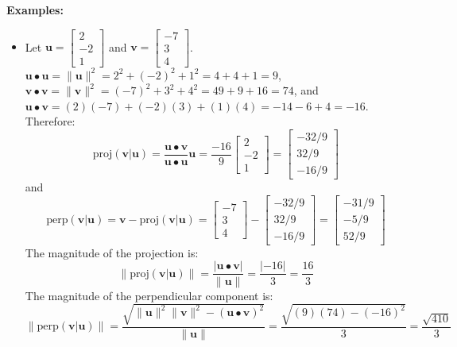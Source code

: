 \documentclass{article}
\begin{document}
\textbf{Examples:}
\begin{itemize}
\item Let \(\mathbf{u} = \begin{bmatrix} 2 \\ -2 \\ 1 \end{bmatrix}\) and \(\mathbf{v} = \begin{bmatrix} -7 \\ 3 \\ 4 \end{bmatrix}\). \\
\(\mathbf{u} \bullet \mathbf{u} = \|\mathbf{u}\|^2 = 2^2 + (-2)^2 + 1^2 = 4 + 4 + 1 = 9\), \\
\(\mathbf{v} \bullet \mathbf{v} = \|\mathbf{v}\|^2 = (-7)^2 + 3^2 + 4^2 = 49 + 9 + 16 = 74\), and \\
\(\mathbf{u} \bullet \mathbf{v} = (2)(-7) + (-2)(3) + (1)(4) = -14 - 6 + 4 = -16\). Therefore:
\[\text{proj}(\mathbf{v}|\mathbf{u}) = \frac{\mathbf{u} \bullet \mathbf{v}}{\mathbf{u} \bullet \mathbf{u}}\mathbf{u} = \frac{-16}{9}\begin{bmatrix} 2 \\ -2 \\ 1 \end{bmatrix} = \begin{bmatrix} -32/9 \\ 32/9 \\ -16/9 \end{bmatrix}\]
and 
\[\text{perp}(\mathbf{v}|\mathbf{u}) = \mathbf{v} - \text{proj}(\mathbf{v}|\mathbf{u}) = \begin{bmatrix} -7 \\ 3 \\ 4 \end{bmatrix} - \begin{bmatrix} -32/9 \\ 32/9 \\ -16/9 \end{bmatrix} = \begin{bmatrix} -31/9 \\ -5/9 \\ 52/9 \end{bmatrix}\]
The magnitude of the projection is:
\[\|\text{proj}(\mathbf{v}|\mathbf{u})\| = \frac{|\mathbf{u} \bullet \mathbf{v}|}{\|\mathbf{u}\|} = \frac{|-16|}{3} = \frac{16}{3}\]
The magnitude of the perpendicular component is:
\[\|\text{perp}(\mathbf{v}|\mathbf{u})\| = \frac{\sqrt{\|\mathbf{u}\|^2\|\mathbf{v}\|^2 - (\mathbf{u} \bullet \mathbf{v})^2}}{\|\mathbf{u}\|} = \frac{\sqrt{(9)(74) - (-16)^2}}{3} = \frac{\sqrt{410}}{3}\]

\end{itemize}
\end{document}
